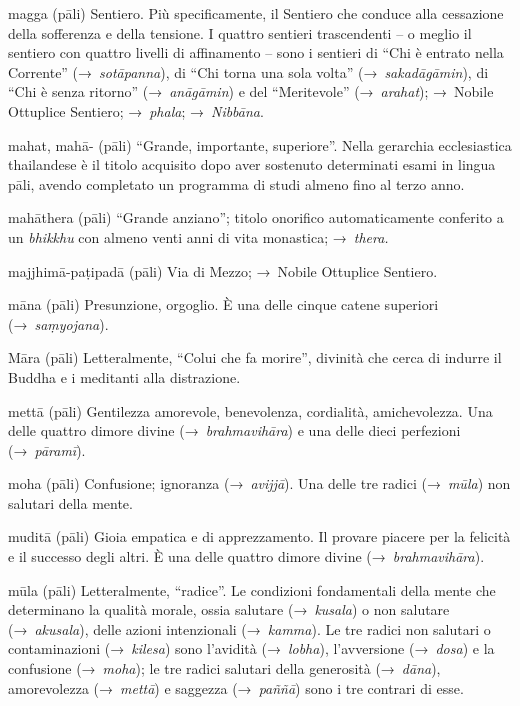 \begin{glossarydescription}

\item[magga] (pāli) Sentiero. Più specificamente, il Sentiero che conduce alla
  cessazione della sofferenza e della tensione. I quattro sentieri trascendenti
  -- o meglio il sentiero con quattro livelli di affinamento -- sono i sentieri
  di ``Chi è entrato nella Corrente'' (→~\emph{sotāpanna}), di ``Chi torna una
  sola volta'' (→~\emph{sakadāgāmin}), di ``Chi è senza ritorno''
  (→~\emph{anāgāmin}) e del ``Meritevole'' (→~\emph{arahat}); →~Nobile Ottuplice
  Sentiero; →~\emph{phala}; →~\emph{Nibbāna}.

\item[mahat, mahā-] (pāli) ``Grande, importante, superiore''. Nella gerarchia
  ecclesiastica thailandese è il titolo acquisito dopo aver sostenuto
  determinati esami in lingua pāli, avendo completato un programma di studi
  almeno fino al terzo anno.

\item[mahāthera] (pāli) ``Grande anziano''; titolo onorifico automaticamente
  conferito a un \emph{bhikkhu} con almeno venti anni di vita monastica;
  →~\emph{thera.}

\item[majjhimā-paṭipadā] (pāli) Via di Mezzo; →~Nobile Ottuplice Sentiero.

\item[māna] (pāli) Presunzione, orgoglio. È una delle cinque catene superiori
  (→~\emph{saṃyojana}).

\item[Māra] (pāli) Letteralmente, ``Colui che fa morire'', divinità che cerca di
  indurre il Buddha e i meditanti alla distrazione.

\item[mettā] (pāli) Gentilezza amorevole, benevolenza, cordialità,
  amichevolezza. Una delle quattro dimore divine (→~\emph{brahmavihāra}) e una
  delle dieci perfezioni (→~\emph{pāramī}).

\item[moha] (pāli) Confusione; ignoranza (→~\emph{avijjā}). Una delle tre radici
  (→~\emph{mūla}) non salutari della mente.

\item[muditā] (pāli) Gioia empatica e di apprezzamento. Il provare piacere per
  la felicità e il successo degli altri. È una delle quattro dimore divine
  (→~\emph{brahmavihāra}).

\item[mūla] (pāli) Letteralmente, ``radice''. Le condizioni fondamentali della
  mente che determinano la qualità morale, ossia salutare (→~\emph{kusala}) o
  non salutare (→~\emph{akusala}), delle azioni intenzionali (→~\emph{kamma}).
  Le tre radici non salutari o contaminazioni (→~\emph{kilesa}) sono l'avidità
  (→~\emph{lobha}), l'avversione (→~\emph{dosa}) e la confusione
  (→~\emph{moha}); le tre radici salutari della generosità (→~\emph{dāna}),
  amorevolezza (→~\emph{mettā}) e saggezza (→~\emph{paññā}) sono i tre contrari
  di esse.


\end{glossarydescription}
